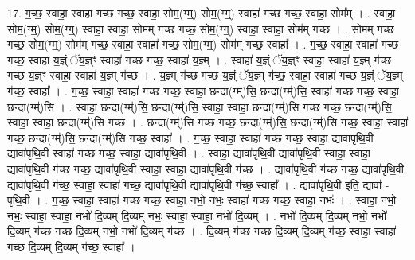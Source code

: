 \documentclass[17pt]{extarticle}
\begin{document}
17. ग॒च्छ॒ स्वाहा॒ स्वाहा॑ गच्छ गच्छ॒ स्वाहा॒ सोम॒(ग्म्॒) सोम॒(ग्ग्॒) स्वाहा॑ गच्छ गच्छ॒ स्वाहा॒ सोम᳚म् । . स्वाहा॒ सोम॒(ग्म्॒) सोम॒(ग्ग्॒) स्वाहा॒ स्वाहा॒ सोम॑म् गच्छ गच्छ॒ सोम॒(ग्ग्॒) स्वाहा॒ स्वाहा॒ सोम॑म् गच्छ । . सोम॑म् गच्छ गच्छ॒ सोम॒(ग्म्॒) सोम॑म् गच्छ॒ स्वाहा॒ स्वाहा॑ गच्छ॒ सोम॒(ग्म्॒) सोम॑म् गच्छ॒ स्वाहा᳚ । . ग॒च्छ॒ स्वाहा॒ स्वाहा॑ गच्छ गच्छ॒ स्वाहा॑ य॒ज्ञ्ं ॅय॒ज्ञ्ꣳ स्वाहा॑ गच्छ गच्छ॒ स्वाहा॑ य॒ज्ञ्म् । . स्वाहा॑ य॒ज्ञ्ं ॅय॒ज्ञ्ꣳ स्वाहा॒ स्वाहा॑ य॒ज्ञ्म् ग॑च्छ गच्छ य॒ज्ञ्ꣳ स्वाहा॒ स्वाहा॑ य॒ज्ञ्म् ग॑च्छ । . य॒ज्ञ्म् ग॑च्छ गच्छ य॒ज्ञ्ं ॅय॒ज्ञ्म् ग॑च्छ॒ स्वाहा॒ स्वाहा॑ गच्छ य॒ज्ञ्ं ॅय॒ज्ञ्म् ग॑च्छ॒ स्वाहा᳚ । . ग॒च्छ॒ स्वाहा॒ स्वाहा॑ गच्छ गच्छ॒ स्वाहा॒ छन्दा(ग्म्॑)सि॒ छन्दा(ग्म्॑)सि॒ स्वाहा॑ गच्छ गच्छ॒ स्वाहा॒ छन्दा(ग्म्॑)सि । . स्वाहा॒ छन्दा(ग्म्॑)सि॒ छन्दा(ग्म्॑)सि॒ स्वाहा॒ स्वाहा॒ छन्दा(ग्म्॑)सि गच्छ गच्छ॒ छन्दा(ग्म्॑)सि॒ स्वाहा॒ स्वाहा॒ छन्दा(ग्म्॑)सि गच्छ । . छन्दा(ग्म्॑)सि गच्छ गच्छ॒ छन्दा(ग्म्॑)सि॒ छन्दा(ग्म्॑)सि गच्छ॒ स्वाहा॒ स्वाहा॑ गच्छ॒ छन्दा(ग्म्॑)सि॒ छन्दा(ग्म्॑)सि गच्छ॒ स्वाहा᳚ । . ग॒च्छ॒ स्वाहा॒ स्वाहा॑ गच्छ गच्छ॒ स्वाहा॒ द्यावा॑पृथि॒वी द्यावा॑पृथि॒वी स्वाहा॑ गच्छ गच्छ॒ स्वाहा॒ द्यावा॑पृथि॒वी । . स्वाहा॒ द्यावा॑पृथि॒वी द्यावा॑पृथि॒वी स्वाहा॒ स्वाहा॒ द्यावा॑पृथि॒वी ग॑च्छ गच्छ॒ द्यावा॑पृथि॒वी स्वाहा॒ स्वाहा॒ द्यावा॑पृथि॒वी ग॑च्छ । . द्यावा॑पृथि॒वी ग॑च्छ गच्छ॒ द्यावा॑पृथि॒वी द्यावा॑पृथि॒वी ग॑च्छ॒ स्वाहा॒ स्वाहा॑ गच्छ॒ द्यावा॑पृथि॒वी द्यावा॑पृथि॒वी ग॑च्छ॒ स्वाहा᳚ । . द्यावा॑पृथि॒वी इति॒ द्यावा᳚ - पृ॒थि॒वी । . ग॒च्छ॒ स्वाहा॒ स्वाहा॑ गच्छ गच्छ॒ स्वाहा॒ नभो॒ नभः॒ स्वाहा॑ गच्छ गच्छ॒ स्वाहा॒ नभः॑ । . स्वाहा॒ नभो॒ नभः॒ स्वाहा॒ स्वाहा॒ नभो॑ दि॒व्यम् दि॒व्यम् नभः॒ स्वाहा॒ स्वाहा॒ नभो॑ दि॒व्यम् । . नभो॑ दि॒व्यम् दि॒व्यम् नभो॒ नभो॑ दि॒व्यम् ग॑च्छ गच्छ दि॒व्यम् नभो॒ नभो॑ दि॒व्यम् ग॑च्छ । . दि॒व्यम् ग॑च्छ गच्छ दि॒व्यम् दि॒व्यम् ग॑च्छ॒ स्वाहा॒ स्वाहा॑ गच्छ दि॒व्यम् दि॒व्यम् ग॑च्छ॒ स्वाहा᳚ । \newline
\end{document}
